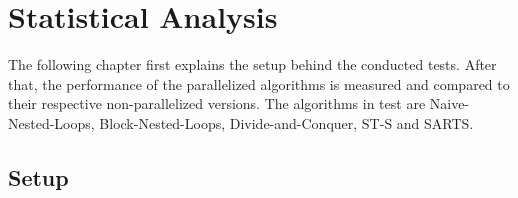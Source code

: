 \chapter{Statistical Analysis} \label{chapter:statistical-analysis}
The following chapter first explains the setup behind the conducted tests. After that, the performance of the parallelized algorithms is measured and compared to their respective non-parallelized versions. The algorithms in test are Naive-Nested-Loops, Block-Nested-Loops, Divide-and-Conquer, ST-S and SARTS. 

\section{Setup}




